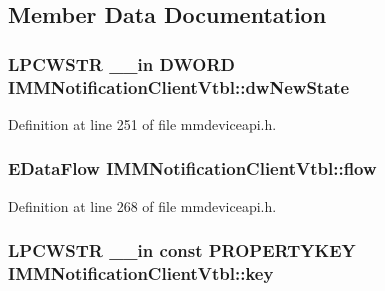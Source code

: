 \subsection{Member Data Documentation}
\subsubsection[{\texorpdfstring{dw\+New\+State}{dwNewState}}]{ {\bf L\+P\+C\+W\+S\+TR} {\bf \+\_\+\+\_\+in} {\bf D\+W\+O\+RD} I\+M\+M\+Notification\+Client\+Vtbl\+::dw\+New\+State}\hypertarget{struct_i_m_m_notification_client_vtbl_a0f7cc5a4eeb4e9dbd332be1657dd191f}{}\label{struct_i_m_m_notification_client_vtbl_a0f7cc5a4eeb4e9dbd332be1657dd191f}


Definition at line 251 of file mmdeviceapi.\+h.

\subsubsection[{\texorpdfstring{flow}{flow}}]{ {\bf E\+Data\+Flow} I\+M\+M\+Notification\+Client\+Vtbl\+::flow}\hypertarget{struct_i_m_m_notification_client_vtbl_ab72bdeb569a768b52b8bd58a5e8adad4}{}\label{struct_i_m_m_notification_client_vtbl_ab72bdeb569a768b52b8bd58a5e8adad4}


Definition at line 268 of file mmdeviceapi.\+h.

\subsubsection[{\texorpdfstring{key}{key}}]{ {\bf L\+P\+C\+W\+S\+TR} {\bf \+\_\+\+\_\+in} {\bf const} {\bf P\+R\+O\+P\+E\+R\+T\+Y\+K\+EY} I\+M\+M\+Notification\+Client\+Vtbl\+::key}\hypertarget{struct_i_m_m_notification_client_vtbl_a4877840e1abb51a8243a665e59c17a05}{}\label{struct_i_m_m_notification_client_vtbl_a4877840e1abb51a8243a665e59c17a05}


